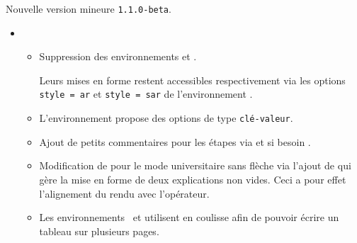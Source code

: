 Nouvelle version mineure \verb+1.1.0-beta+.

\begin{itemize}[itemsep=.5em]
    \item {}
    \begin{itemize}[itemsep=.5em]
        \item Suppression des environnements  et .

              \smallskip

              Leurs mises en forme restent accessibles respectivement via les options \verb+style = ar+ et \verb+style = sar+ de l'environnement .


        \item L'environnement  propose des options de type \texttt{clé-valeur}.


        \item Ajout de petits commentaires pour les étapes via  et si besoin .


        \item Modification de  pour le mode universitaire sans flèche via l'ajout de  qui gère la mise en forme de deux explications non vides.
              Ceci a pour effet l'alignement du rendu avec l'opérateur.


        \item Les environnements  et  utilisent  en coulisse afin de pouvoir écrire un tableau sur plusieurs pages.
    \end{itemize}
\end{itemize}
